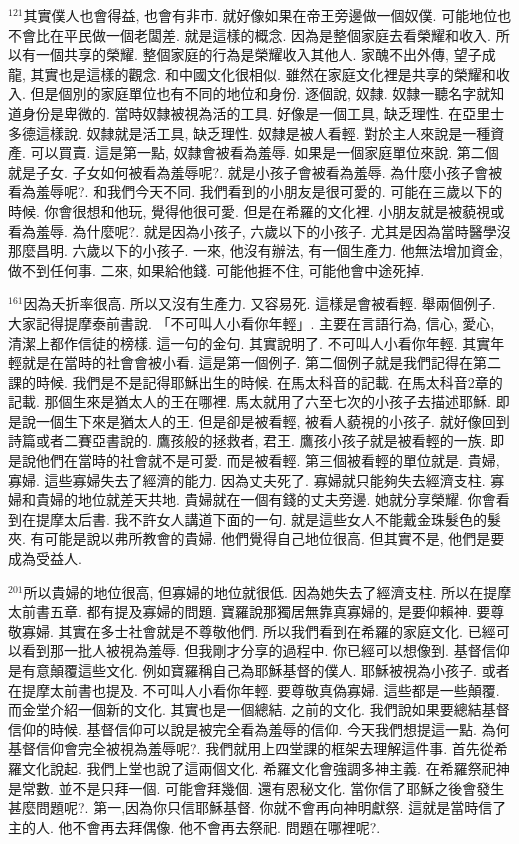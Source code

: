 \documentclass{book}
\begin{document}
$^{121}$其實僕人也會得益, 也會有非市.
就好像如果在帝王旁邊做一個奴僕.
可能地位也不會比在平民做一個老闆差.
就是這樣的概念.
因為是整個家庭去看榮耀和收入.
所以有一個共享的榮耀.
整個家庭的行為是榮耀收入其他人.
家醜不出外傳, 望子成龍, 其實也是這樣的觀念.
和中國文化很相似.
雖然在家庭文化裡是共享的榮耀和收入.
但是個別的家庭單位也有不同的地位和身份.
逐個說, 奴隸.
奴隸一聽名字就知道身份是卑微的.
當時奴隸被視為活的工具.
好像是一個工具, 缺乏理性.
在亞里士多德這樣說.
奴隸就是活工具, 缺乏理性.
奴隸是被人看輕.
對於主人來說是一種資產.
可以買賣.
這是第一點, 奴隸會被看為羞辱.
如果是一個家庭單位來說.
第二個就是子女.
子女如何被看為羞辱呢?.
就是小孩子會被看為羞辱.
為什麼小孩子會被看為羞辱呢?.
和我們今天不同.
我們看到的小朋友是很可愛的.
可能在三歲以下的時候.
你會很想和他玩, 覺得他很可愛.
但是在希羅的文化裡.
小朋友就是被藐視或看為羞辱.
為什麼呢?.
就是因為小孩子, 六歲以下的小孩子.
尤其是因為當時醫學沒那麼昌明.
六歲以下的小孩子.
一來, 他沒有辦法, 有一個生產力.
他無法增加資金, 做不到任何事.
二來, 如果給他錢.
可能他捱不住, 可能他會中途死掉.

$^{161}$因為夭折率很高.
所以又沒有生產力.
又容易死.
這樣是會被看輕.
舉兩個例子.
大家記得提摩泰前書說.
「不可叫人小看你年輕」.
主要在言語行為, 信心, 愛心, 清潔上都作信徒的榜樣.
這一句的金句.
其實說明了.
不可叫人小看你年輕.
其實年輕就是在當時的社會會被小看.
這是第一個例子.
第二個例子就是我們記得在第二課的時候.
我們是不是記得耶穌出生的時候.
在馬太科音的記載.
在馬太科音2章的記載.
那個生來是猶太人的王在哪裡.
馬太就用了六至七次的小孩子去描述耶穌.
即是說一個生下來是猶太人的王.
但是卻是被看輕, 被看人藐視的小孩子.
就好像回到詩篇或者二賽亞書說的.
鷹孩般的拯救者, 君王.
鷹孩小孩子就是被看輕的一族.
即是說他們在當時的社會就不是可愛.
而是被看輕.
第三個被看輕的單位就是.
貴婦, 寡婦.
這些寡婦失去了經濟的能力.
因為丈夫死了.
寡婦就只能夠失去經濟支柱.
寡婦和貴婦的地位就差天共地.
貴婦就在一個有錢的丈夫旁邊.
她就分享榮耀.
你會看到在提摩太后書.
我不許女人講道下面的一句.
就是這些女人不能戴金珠髮色的髮夾.
有可能是說以弗所教會的貴婦.
他們覺得自己地位很高.
但其實不是, 他們是要成為受益人.

$^{201}$所以貴婦的地位很高, 但寡婦的地位就很低.
因為她失去了經濟支柱.
所以在提摩太前書五章.
都有提及寡婦的問題.
寶羅說那獨居無靠真寡婦的, 是要仰賴神.
要尊敬寡婦.
其實在多士社會就是不尊敬他們.
所以我們看到在希羅的家庭文化.
已經可以看到那一批人被視為羞辱.
但我剛才分享的過程中.
你已經可以想像到.
基督信仰是有意顛覆這些文化.
例如寶羅稱自己為耶穌基督的僕人.
耶穌被視為小孩子.
或者在提摩太前書也提及.
不可叫人小看你年輕.
要尊敬真偽寡婦.
這些都是一些顛覆.
而金堂介紹一個新的文化.
其實也是一個總結.
之前的文化.
我們說如果要總結基督信仰的時候.
基督信仰可以說是被完全看為羞辱的信仰.
今天我們想提這一點.
為何基督信仰會完全被視為羞辱呢?.
我們就用上四堂課的框架去理解這件事.
首先從希羅文化說起.
我們上堂也說了這兩個文化.
希羅文化會強調多神主義.
在希羅祭祀神是常數.
並不是只拜一個.
可能會拜幾個.
還有恩秘文化.
當你信了耶穌之後會發生甚麼問題呢?.
第一,因為你只信耶穌基督.
你就不會再向神明獻祭.
這就是當時信了主的人.
他不會再去拜偶像.
他不會再去祭祀.
問題在哪裡呢?.
\end{document}
